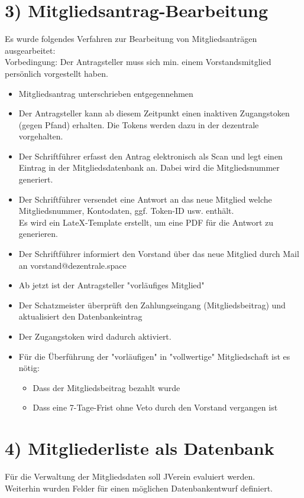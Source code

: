 \documentclass[10pt,a4paper]{scrartcl}
\newcommand{\qs}[1]{"#1"}
\begin{document}
\section*{3) Mitgliedsantrag-Bearbeitung}
	Es wurde folgendes Verfahren zur Bearbeitung von Mitgliedsantr{\"a}gen ausgearbeitet:\\
	Vorbedingung: Der Antragsteller muss sich min. einem Vorstandsmitglied pers{\"o}nlich vorgestellt haben.\\
	\begin{itemize}
		\item Mitgliedsantrag unterschrieben entgegennehmen
		\item Der Antragsteller kann ab diesem Zeitpunkt einen inaktiven Zugangstoken (gegen Pfand) erhalten. Die Tokens werden dazu in der dezentrale vorgehalten.
		\item Der Schriftf{\"u}hrer erfasst den Antrag elektronisch als Scan und legt einen Eintrag in der Mitgliedsdatenbank an. Dabei wird die Mitgliedsnummer generiert.
		\item Der Schriftf{\"u}hrer versendet eine Antwort an das neue Mitglied welche Mitgliedsnummer, Kontodaten, ggf. Token-ID usw. enth{\"a}lt.\\
		Es wird ein LateX-Template erstellt, um eine PDF für die Antwort zu generieren.
		\item Der Schriftf{\"u}hrer informiert den Vorstand {\"u}ber das neue Mitglied durch Mail an vorstand@dezentrale.space
		\item Ab jetzt ist der Antragsteller \qs{vorl{\"a}ufiges Mitglied}
		\item Der Schatzmeister {\"u}berpr{\"u}ft den Zahlungseingang (Mitgliedsbeitrag) und aktualisiert den Datenbankeintrag
		\item Der Zugangstoken wird dadurch aktiviert.
		\item F{\"u}r die {\"U}berführung der \qs{vorl{\"a}ufigen} in \qs{vollwertige} Mitgliedschaft ist es n{\"o}tig:\\
		\begin{itemize}
			\item Dass der Mitgliedsbeitrag bezahlt wurde
			\item Dass eine 7-Tage-Frist ohne Veto durch den Vorstand vergangen ist
		\end{itemize}
	\end{itemize}

\section*{4) Mitgliederliste als Datenbank}
Für die Verwaltung der Mitgliedsdaten soll JVerein evaluiert werden.\\
Weiterhin wurden Felder f{\"u}r einen m{\"o}glichen Datenbankentwurf definiert.
\end{document}
